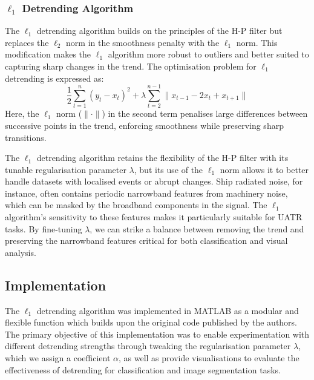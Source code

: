\subsubsection{\texorpdfstring{$\ell_1$}{l1} Detrending Algorithm}
The $\ell_1$ detrending algorithm \cite{kim_ell_1_2009} builds on the principles of the H-P filter but replaces the $\ell_2$ norm in the smoothness penalty with the $\ell_1$ norm. This modification makes the $\ell_1$ algorithm more robust to outliers and better suited to capturing sharp changes in the trend. The optimisation problem for $\ell_1$ detrending is expressed as:
\begin{equation}
    \frac{1}{2} \sum_{t=1}^n (y_t - x_t)^2 + \lambda \sum_{t=2}^{n-1} \| x_{t-1} - 2x_t + x_{t+1} \|
\end{equation}
Here, the $\ell_1$ norm ($\| \cdot \|$) in the second term penalises large differences between successive points in the trend, enforcing smoothness while preserving sharp transitions.

The $\ell_1$ detrending algorithm retains the flexibility of the H-P filter with its tunable regularisation parameter $\lambda$, but its use of the $\ell_1$ norm allows it to better handle datasets with localised events or abrupt changes. Ship radiated noise, for instance, often contains periodic narrowband features from machinery noise, which can be masked by the broadband components in the signal. The $\ell_1$ algorithm’s sensitivity to these features makes it particularly suitable for UATR tasks. By fine-tuning $\lambda$, we can strike a balance between removing the trend and preserving the narrowband features critical for both classification and visual analysis.

\subsection{Implementation}

The $\ell_1$ detrending algorithm was implemented in MATLAB as a modular and flexible function which builds upon the original code published by the authors. The primary objective of this implementation was to enable experimentation with different detrending strengths through tweaking the regularisation parameter $\lambda$, which we assign a coefficient $\alpha$, as well as provide visualisations to evaluate the effectiveness of detrending for classification and image segmentation tasks.

